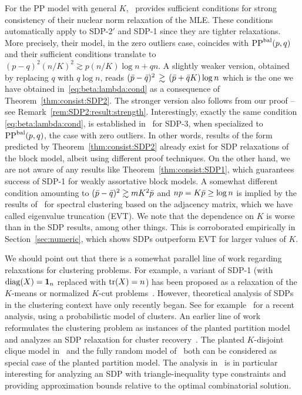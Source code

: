 For the PP model with general $K$,~\cite{Chen2014} provides sufficient conditions for strong consistency of their nuclear norm relaxation of the MLE. These conditions automatically apply to SDP-$2'$ and SDP-1 since they are tighter relaxations. More
precisely, their model, in the zero outliers case, coincides with $\text{PP}^{\text{bal}}(p,q)$ and their sufficient conditions translate to $(p-q)^2 (n/K)^2 \gtrsim p (n/K)\log n + q n$. A slightly weaker version, obtained by replacing $q$ with $q \log n$, reads $(\bar{p} - \bar{q})^2 \, \gtrsim\, (\bar{p} + \bar{q} K) \log n $ which is the one we have obtained in~\eqref{eq:beta:lambda:cond} as a consequence of Theorem~\ref{thm:consist:SDP2}.  The stronger version also follows from our proof -- see Remark~\ref{rem:SDP2:result:strength}.  Interestingly, exactly the same condition \eqref{eq:beta:lambda:cond}, is established in~\cite{Cai2014} for
SDP-3, when specialized to $\text{PP}^{\text{bal}}(p,q)$, the case with zero outliers. In other words, results of the form predicted by Theorem~\ref{thm:consist:SDP2} already exist for SDP relaxations of the block model, albeit using different proof techniques. On the other hand, we are not aware of any results like Theorem~\ref{thm:consist:SDP1}, which guarantees success of SDP-1 for weakly assortative block models.  
%
A somewhat different condition
amounting to $(\bar{p} -\bar{q})^2 \gtrsim m K^2 \bar{p}$ and $np = K\bar{p} \ge \log
n$ is implied by the results of~\cite{Lei&Rinaldo2013} for spectral clustering
based on the adjacency matrix, which we have called eigenvalue
truncation (EVT). We note that the dependence on $K$ is worse than in the SDP results, among other things.
 This is corroborated empirically in Section~\ref{sec:numeric}, which shows SDPs outperform EVT for larger values of $K$.

We should point out that there is a somewhat parallel line of work regarding relaxations for clustering problems. For example, a variant of SDP-1 (with $\operatorname{diag}(X) = \bm{1}_n$ replaced with $\operatorname*{tr}(X) = n$) has been proposed as a relaxation of the $K$-means or normalized $K$-cut problems~\cite{Xing2003,Peng2007}. However, theoretical analysis of SDPs in the clustering context have only recently began. See for example~\cite{Awasthi2014} for a recent analysis, using a probabilistic model of clusters. An earlier line of work reformulates the clustering problem as instances of the planted partition model and analyzes an SDP relaxation for cluster recovery~\cite{Ames2010,Mathieu2010}. The planted $K$-disjoint clique model in~\cite{Ames2010} and the fully random model of~\cite{Mathieu2010} both can be considered as special case of the planted partition model. The analysis in~\cite{Mathieu2010} is in particular interesting for analyzing an SDP with triangle-inequality type constraints and providing approximation bounds relative to the optimal combinatorial solution.



